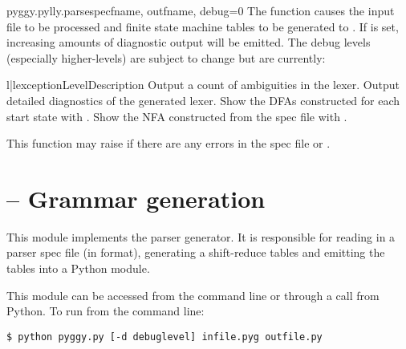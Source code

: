 \begin{funcdesc}{pyggy.pylly.parsespec}{fname, outfname, debug=0}
The  function causes the input file 
to be processed and finite state machine tables to be generated to
.  If  is set, increasing amounts of diagnostic
output will be emitted.  The debug levels (especially higher-levels)
are subject to change but are currently:

\begin{tableii}{l|l}{exception}{Level}{Description}
   {Output a count of ambiguities in the lexer.}
   {Output detailed diagnostics of the generated lexer.}
   {Show the DFAs constructed for each start state with .}
   {Show the NFA constructed from the spec file with .}
\end{tableii}

This function may raise  if there are any
errors in the spec file or .
\end{funcdesc}



\section{ -- Grammar generation}


This module implements the parser generator.  It is responsible for
reading in a parser spec file (in  format), generating
a shift-reduce tables and emitting the tables into a
Python module.

This module can be accessed from the command line or through a call
from Python.  To run from the command line:

\begin{verbatim}
$ python pyggy.py [-d debuglevel] infile.pyg outfile.py
\end{verbatim}

